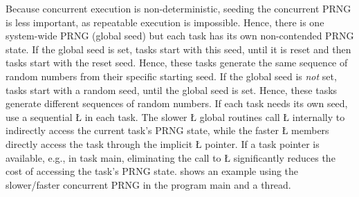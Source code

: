 \documentclass[openright,twoside]{report}
\begin{document}
\begin{itemize}
Because concurrent execution is non-deterministic, seeding the concurrent PRNG is less important, as repeatable execution is impossible.
Hence, there is one system-wide PRNG (global seed) but each \uC task has its own non-contended PRNG state.
If the global seed is set, tasks start with this seed, until it is reset and then tasks start with the reset seed.
Hence, these tasks generate the same sequence of random numbers from their specific starting seed.
If the global seed is \emph{not} set, tasks start with a random seed, until the global seed is set.
Hence, these tasks generate different sequences of random numbers.
If each task needs its own seed, use a sequential \LGinlinetrue\LGbegin\lgrinde\L{}\endlgrinde\LGend{} in each task.
The slower \LGinlinetrue\LGbegin\lgrinde\L{}\endlgrinde\LGend{} global routines call \LGinlinetrue\LGbegin\lgrinde\L{}\endlgrinde\LGend{} internally to indirectly access the current task's PRNG state, while the faster \LGinlinetrue\LGbegin\lgrinde\L{}\endlgrinde\LGend{} members directly access the task through the implicit \LGinlinetrue\LGbegin\lgrinde\L{}\endlgrinde\LGend{} pointer.
If a task pointer is available, e.g., in task main, eliminating the call to \LGinlinetrue\LGbegin\lgrinde\L{}\endlgrinde\LGend{} significantly reduces the cost of accessing the task's PRNG state.
 shows an example using the slower/faster concurrent PRNG in the program main and a thread.


\end{itemize}
\end{document}

